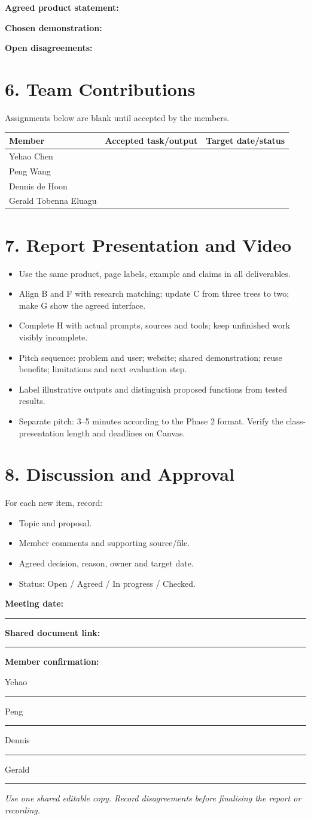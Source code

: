 \documentclass[10pt,a4paper]{article}
\newcommand{\blank}{\rule{3cm}{0.4pt}}
\begin{document}
\textbf{Agreed product statement:} \hrulefill\par
\textbf{Chosen demonstration:} \hrulefill\par
\textbf{Open disagreements:} \hrulefill

\section*{6. Team Contributions}
Assignments below are blank until accepted by the members.

\begin{tabularx}{\textwidth}{@{}lXX@{}}
\toprule
\textbf{Member} & \textbf{Accepted task/output} & \textbf{Target date/status} \\
\midrule
Yehao Chen & & \\[8pt]
Peng Wang & & \\[8pt]
Dennis de Hoon & & \\[8pt]
Gerald Tobenna Eluagu & & \\[8pt]
\bottomrule
\end{tabularx}

\section*{7. Report Presentation and Video}
\begin{itemize}
\item Use the same product, page labels, example and claims in all deliverables.
\item Align B and F with research matching; update C from three trees to two; make G show the agreed interface.
\item Complete H with actual prompts, sources and tools; keep unfinished work visibly incomplete.
\item Pitch sequence: problem and user; website; shared demonstration; reuse benefits; limitations and next evaluation step.
\item Label illustrative outputs and distinguish proposed functions from tested results.
\item Separate pitch: 3--5 minutes according to the Phase 2 format. Verify the class-presentation length and deadlines on Canvas.
\end{itemize}

\section*{8. Discussion and Approval}
For each new item, record:
\begin{itemize}
\item Topic and proposal.
\item Member comments and supporting source/file.
\item Agreed decision, reason, owner and target date.
\item Status: Open / Agreed / In progress / Checked.
\end{itemize}

\textbf{Meeting date:} \blank\quad\textbf{Shared document link:} \blank

\textbf{Member confirmation:}\par
Yehao \blank\quad Peng \blank\par
Dennis \blank\quad Gerald \blank

\smallskip
\textit{Use one shared editable copy. Record disagreements before finalising the report or recording.}
\end{document}
